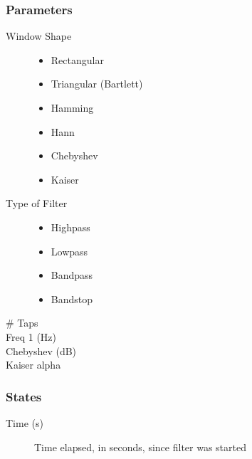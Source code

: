 \subsubsection{Parameters}
\begin{description}
\item [Window Shape]  
  \begin{itemize}
  \item Rectangular
  \item Triangular (Bartlett)
  \item Hamming
  \item Hann
  \item Chebyshev
  \item Kaiser
  \end{itemize}
\item [Type of Filter]
  \begin{itemize}
  \item Highpass
  \item Lowpass
  \item Bandpass
  \item Bandstop
  \end{itemize}
\item [\# Taps]
\item [Freq 1 (Hz)]
\item [Chebyshev (dB)]
\item [Kaiser alpha]
\end{description}

\subsubsection{States}
\begin{description}
\item [Time (s)] Time elapsed, in seconds, since filter was started
\end{description}